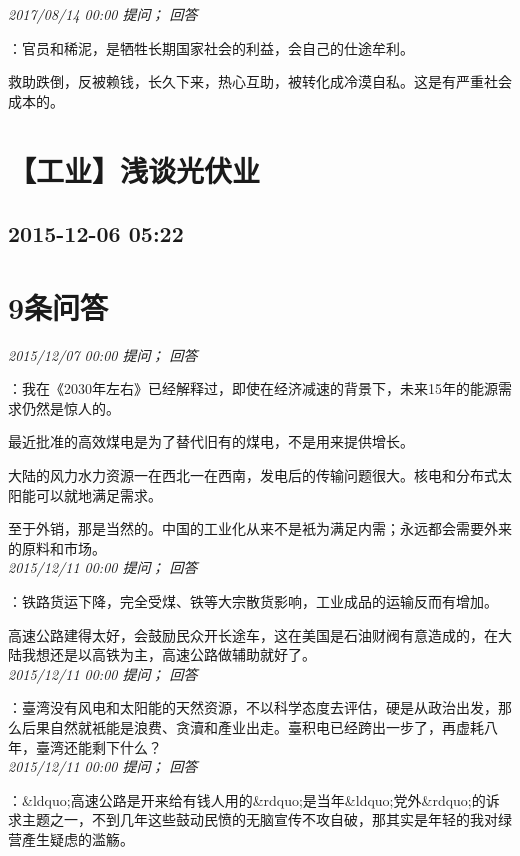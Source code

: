 \documentclass[twocolumn]{ctexart}
\begin{document}
\textit{\hfill\noindent\small 2017/08/14 00:00 提问； 回答}

：官员和稀泥，是牺牲长期国家社会的利益，会自己的仕途牟利。

救助跌倒，反被赖钱，长久下来，热心互助，被转化成冷漠自私。这是有严重社会成本的。\\


\section{【工业】浅谈光伏业}
\subsection{2015-12-06 05:22}


\section{9条问答}

\textit{\hfill\noindent\small 2015/12/07 00:00 提问； 回答}

：我在《2030年左右》已经解释过，即使在经济减速的背景下，未来15年的能源需求仍然是惊人的。

最近批准的高效煤电是为了替代旧有的煤电，不是用来提供增长。

大陆的风力水力资源一在西北一在西南，发电后的传输问题很大。核电和分布式太阳能可以就地满足需求。

至于外销，那是当然的。中国的工业化从来不是衹为满足内需；永远都会需要外来的原料和市场。\\

\textit{\hfill\noindent\small 2015/12/11 00:00 提问； 回答}

：铁路货运下降，完全受煤、铁等大宗散货影响，工业成品的运输反而有增加。

高速公路建得太好，会鼓励民众开长途车，这在美国是石油财阀有意造成的，在大陆我想还是以高铁为主，高速公路做辅助就好了。\\

\textit{\hfill\noindent\small 2015/12/11 00:00 提问； 回答}

：臺湾没有风电和太阳能的天然资源，不以科学态度去评估，硬是从政治出发，那么后果自然就衹能是浪费、贪瀆和產业出走。臺积电已经跨出一步了，再虚耗八年，臺湾还能剩下什么？\\

\textit{\hfill\noindent\small 2015/12/11 00:00 提问； 回答}

：\&ldquo;高速公路是开来给有钱人用的\&rdquo;是当年\&ldquo;党外\&rdquo;的诉求主题之一，不到几年这些鼓动民愤的无脑宣传不攻自破，那其实是年轻的我对绿营產生疑虑的滥觞。
\end{document}
